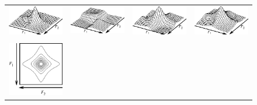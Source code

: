 \renewcommand{\baselinestretch}{1}
\normalsize
\begin{figure}[hbt]
\begin{center}

\begin{tabular}{llll}
\includegraphics[scale=0.9]{ContSurf/surf1.eps} & 
\includegraphics[scale=0.9]{ContSurf/surf2.eps} & 
\includegraphics[scale=0.9]{ContSurf/surf3.eps} & 
\includegraphics[scale=0.9]{ContSurf/surf4.eps} \\
\rule[0mm]{0mm}{2mm} \\
\includegraphics[scale=0.9]{ContSurf/cont1.eps} & 

\end{tabular}
\end{center}
\end{figure}
